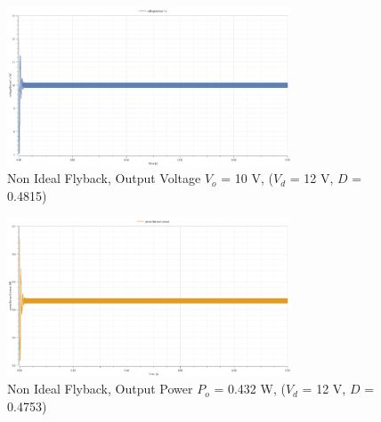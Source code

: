 \documentclass[12pt,twoside]{scrartcl}
\begin{document}
\begin{figure}[htp]
    \centering
    \includegraphics[width=0.75\textwidth]{NonIdealSim12V(tested).png}
    \caption{Non Ideal Flyback, Output Voltage $V_o$ = 10 V, ($V_d$ = 12 V, $D$ = 0.4815)}
    \label{fig:NonIdealSim12Vtested}
\end{figure}

\begin{figure}[htp]
    \centering
    \includegraphics[width=0.75\textwidth]{PowerNonIdealSim12V.png}
    \caption{Non Ideal Flyback, Output Power $P_o$ = 0.432 W, ($V_d$ = 12 V, $D$ = 0.4753)}
    \label{fig:PowerNonIdealSim12V}
\end{figure}
\end{document}
